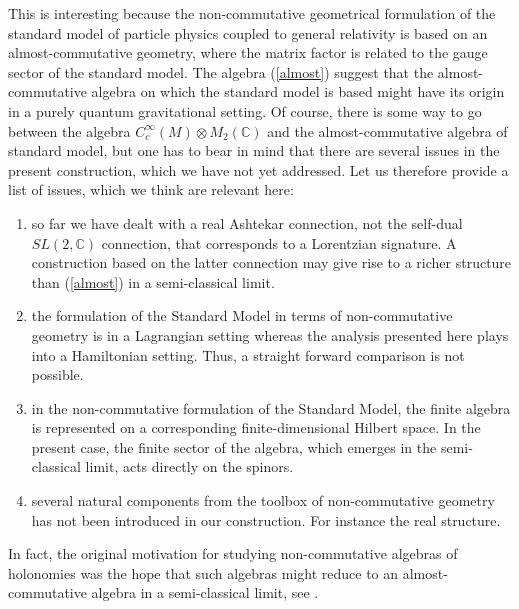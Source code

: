 \documentclass[12pt]{article}
\begin{document}
This is interesting because the non-commutative geometrical formulation of the standard model of particle physics coupled to general relativity is based on an almost-commutative geometry, where the matrix factor is related to the gauge sector of the standard model. The algebra (\ref{almost}) suggest that the almost-commutative algebra on which the standard model is based might have its origin in a purely quantum gravitational setting.
%
Of course, there is some way to go between the algebra $C_c^\infty(M)\otimes M_2(\mathbb{C})$ and the almost-commutative algebra of standard model, but one has to bear in mind that there are several issues in the present construction, which we have not yet addressed. Let us therefore provide a list of issues, which we think are relevant here:
\begin{enumerate}
\item
so far we have dealt with a real Ashtekar connection, not the self-dual $SL(2,\mathbb{C})$ connection, that corresponds to a Lorentzian signature. A construction based on the latter connection may give rise to a richer structure than (\ref{almost}) in a semi-classical limit.
\item
the formulation of the Standard Model in terms of non-commutative geometry is in a Lagrangian setting whereas the analysis presented here plays into a Hamiltonian setting. Thus, a straight forward comparison is not possible.
\item
in the non-commutative formulation of the Standard Model, the finite algebra is represented on a corresponding finite-dimensional Hilbert space. In the present case, the finite sector of the algebra, which emerges in the semi-classical limit, acts directly on the spinors. 
\item
several natural components from the toolbox of non-commutative geometry has not been introduced in our construction. For instance the real structure.
\end{enumerate}

In fact, the original motivation for studying non-commutative algebras of holonomies was the hope that such algebras might reduce to an almost-commutative algebra in a semi-classical limit, see \cite{Aastrup:2005yk}. %
\end{document}
